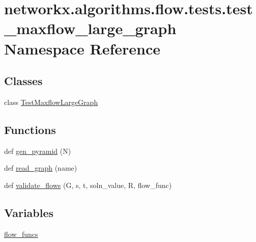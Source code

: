 \hypertarget{namespacenetworkx_1_1algorithms_1_1flow_1_1tests_1_1test__maxflow__large__graph}{}\section{networkx.\+algorithms.\+flow.\+tests.\+test\+\_\+maxflow\+\_\+large\+\_\+graph Namespace Reference}
\label{namespacenetworkx_1_1algorithms_1_1flow_1_1tests_1_1test__maxflow__large__graph}
\subsection*{Classes}
\begin{DoxyCompactItemize}
\item 
class \hyperlink{classnetworkx_1_1algorithms_1_1flow_1_1tests_1_1test__maxflow__large__graph_1_1TestMaxflowLargeGraph}{Test\+Maxflow\+Large\+Graph}
\end{DoxyCompactItemize}
\subsection*{Functions}
\begin{DoxyCompactItemize}
\item 
def \hyperlink{namespacenetworkx_1_1algorithms_1_1flow_1_1tests_1_1test__maxflow__large__graph_a671d89e4040aea55c1949dcb3bc20b22}{gen\+\_\+pyramid} (N)
\item 
def \hyperlink{namespacenetworkx_1_1algorithms_1_1flow_1_1tests_1_1test__maxflow__large__graph_a2b0621f48aa27d149ae880e2d61fb6c0}{read\+\_\+graph} (name)
\item 
def \hyperlink{namespacenetworkx_1_1algorithms_1_1flow_1_1tests_1_1test__maxflow__large__graph_a7b4cbaaeedf5ee968002b0f25c806fcc}{validate\+\_\+flows} (G, s, t, soln\+\_\+value, R, flow\+\_\+func)
\end{DoxyCompactItemize}
\subsection*{Variables}
\begin{DoxyCompactItemize}
\item 
\hyperlink{namespacenetworkx_1_1algorithms_1_1flow_1_1tests_1_1test__maxflow__large__graph_ab64553ad890d568d1ce3e732088cf0e4}{flow\+\_\+funcs}
\end{DoxyCompactItemize}


